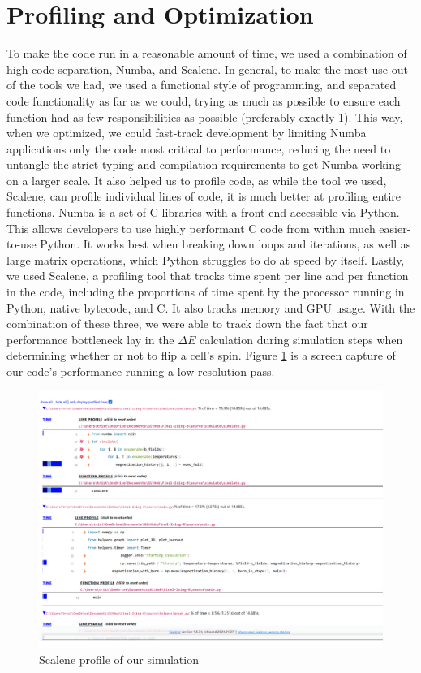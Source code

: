 \documentclass[%
 reprint,
 amsmath,amssymb,
 aps,
]{revtex4-2}
\begin{document}
\section{\label{sec:level1}Profiling and Optimization}
To make the code run in a reasonable amount of time, we used a combination of high code separation, Numba, and Scalene.
In general, to make the most use out of the tools we had, we used a functional style of programming, and separated code functionality as far as we could, trying as much as possible to ensure each function had as few responsibilities as possible (preferably exactly 1). This way, when we optimized, we could fast-track development by limiting Numba applications only the code most critical to performance, reducing the need to untangle the strict typing and compilation requirements to get Numba working on a larger scale. It also helped us to profile code, as while the tool we used, Scalene, can profile individual lines of code, it is much better at profiling entire functions.
Numba is a set of C libraries with a front-end accessible via Python. This allows developers to use highly performant C code from within much easier-to-use Python. It works best when breaking down loops and iterations, as well as large matrix operations, which Python struggles to do at speed by itself.
Lastly, we used Scalene, a profiling tool that tracks time spent per line and per function in the code, including the proportions of time spent by the processor running in Python, native bytecode, and C. It also tracks memory and GPU usage.
With the combination of these three, we were able to track down the fact that our performance bottleneck lay in the $\Delta E$ calculation during simulation steps when determining whether or not to flip a cell's spin. Figure \ref{fig:Scalene-Screenshot} is a screen capture of our code's performance running a low-resolution pass.

\begin{figure}
    \centering
    \includegraphics[width=1\linewidth]{Scalene-Screenshot.png}
    \caption{Scalene profile of our simulation}
    \label{fig:Scalene-Screenshot}
\end{figure}


 
\end{document}
